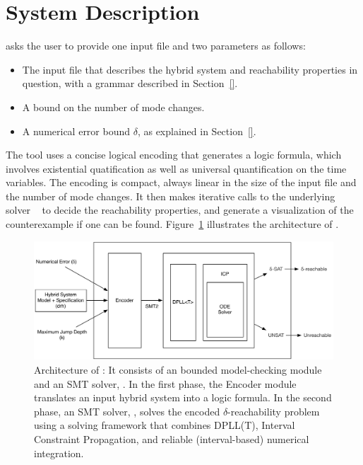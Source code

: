 \section{System Description}\label{sec:system}

\dReach{} asks the user to provide one input file and two parameters as follows: 
\begin{itemize}
\item The input file that describes the hybrid system and reachability properties in question, with a grammar described in Section~\ref{}. 
\item A bound on the number of mode changes. 
\item A numerical error bound $\delta$, as explained in Section~\ref{}.
\end{itemize}

The tool uses a concise logical encoding that generates a logic formula, which involves existential quatification as well as universal quantification on the time variables. The encoding is compact, always linear in the size of the input file and the number of mode changes. It then makes iterative calls to the underlying solver \dReal{}~\cite{DBLP:conf/cade/GaoKC13} to decide the reachability properties, and generate a visualization of the counterexample if one can be found. Figure~\ref{fig:system-description} illustrates the architecture of
\dReach{}. 

\begin{figure}[!h]
  \centering
  \includegraphics[width=\textwidth]{images/dreach_archi}
  \caption{Architecture of \dReach{}: It consists of an bounded
    model-checking module and an SMT solver, \dReal{}. In the first
    phase, the Encoder module translates an input hybrid system into a
    logic formula. In the second phase, an
    SMT solver, \dReal{}, solves the encoded $\delta$-reachability
    problem using a solving framework that combines DPLL(T), Interval Constraint Propagation, and reliable (interval-based) numerical integration. 
  }  
  \label{fig:system-description}
\end{figure}



